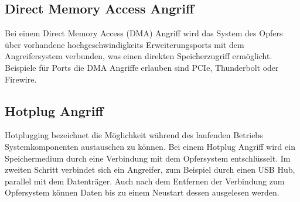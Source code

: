 \documentclass[conference]{IEEEtran}
\begin{document}
\subsection{Direct Memory Access Angriff}
Bei einem Direct Memory Access (DMA) Angriff wird das System des Opfers über vorhandene hochgeschwindigkeits Erweiterungsports mit dem Angreifersystem verbunden, was einen direkten Speicherzugriff ermöglicht. Beispiele für Ports die DMA Angriffe erlauben sind PCIe, Thunderbolt oder Firewire.

\subsection{Hotplug Angriff}
Hotplugging bezeichnet die Möglichkeit während des laufenden Betriebs Systemkomponenten austauschen zu können. Bei einem Hotplug Angriff wird ein Speichermedium durch eine Verbindung mit dem Opfersystem entschlüsselt. Im zweiten Schritt verbindet sich ein Angreifer, zum Beispiel durch einen USB Hub, parallel mit dem Datenträger. Auch nach dem Entfernen der Verbindung zum Opfersystem können Daten bis zu einem Neustart dessen ausgelesen werden. \cite{GuruprasadBidare.2017}
\end{document}
